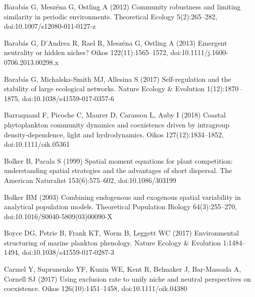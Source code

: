 \documentclass[a4paper,12pt]{article}
\begin{document}
\begin{thebibliography}{68}
Barab\'as G, Mesz\'ena G, Ostling A (2012) Community robustness and limiting
  similarity in periodic environments. Theoretical Ecology 5(2):265--282,
  doi:{10.1007/s12080-011-0127-z}

Barab\'as G, D'Andrea R, Rael R, Mesz\'ena G, Ostling A (2013) Emergent
  neutrality or hidden niches? Oikos 122(11):1565--1572,
  doi:{10.1111/j.1600-0706.2013.00298.x}

Barab\'as G, Michalska-Smith MJ, Allesina S (2017) Self-regulation and the
  stability of large ecological networks. Nature Ecology \& Evolution
  1(12):1870--1875, doi:{10.1038/s41559-017-0357-6}

Barraquand F, Picoche C, Maurer D, Carassou L, Auby I (2018) Coastal
  phytoplankton community dynamics and coexistence driven by intragroup
  density-dependence, light and hydrodynamics. Oikos 127(12):1834--1852,
  doi:{10.1111/oik.05361}

Bolker B, Pacala S (1999) Spatial moment equations for plant competition:
  understanding spatial strategies and the advantages of short dispersal. The
  American Naturalist 153(6):575--602, doi:{10.1086/303199}

Bolker BM (2003) Combining endogenous and exogenous spatial variability in
  analytical population models. Theoretical Population Biology 64(3):255--270,
  doi:{10.1016/S0040-5809(03)00090-X}

Boyce DG, Petrie B, Frank KT, Worm B, Leggett WC (2017) Environmental
  structuring of marine plankton phenology. Nature Ecology \& Evolution
  1:1484--1494, doi:{10.1038/s41559-017-0287-3}

Carmel Y, Suprunenko YF, Kunin WE, Kent R, Belmaker J, Bar-Massada A, Cornell
  SJ (2017) Using exclusion rate to unify niche and neutral perspectives on
  coexistence. Oikos 126(10):1451--1458, doi:{10.1111/oik.04380}


\end{thebibliography}
\end{document}
